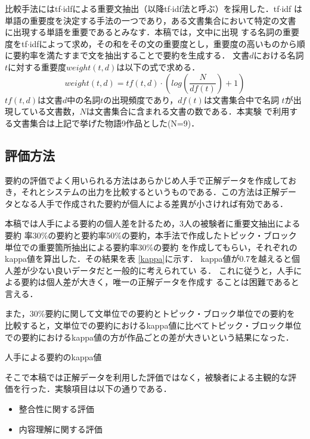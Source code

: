 \documentclass[japanese]{jnlp_1.4}
\begin{document}
 比較手法にはtf$\cdot$idfによる重要文抽出（以降tf$\cdot$idf法と呼ぶ）を採用した．tf$\cdot$idf
 は単語の重要度を決定する手法の一つであり，ある文書集合において特定の文書
 に出現する単語を重要であるとみなす．本稿では，文中に出現
 する名詞の重要度をtf$\cdot$idfによって求め，その和をその文の重要度とし，重要度の高いものから順に要約率を満たすまで文を抽出することで要約を生成する．
 文書$d$における名詞$t$に対する重要度$weight(t,d)$は以下の式で求める．
 \[
  weight(t,d)=tf(t,d) \cdot (log\left(\frac{N}{df(t)}\right)+1)
 \]
$tf(t,d)$は文書$d$中の名詞$t$の出現頻度であり，$df(t)$は文書集合中で名詞
$t$が出現している文書数，$N$は文書集合に含まれる文書の数である．本実験
で利用する文書集合は上記で挙げた物語9作品とした(N=9)．


 \subsection{評価方法}

 要約の評価でよく用いられる方法はあらかじめ人手で正解データを作成してお
 き，それとシステムの出力を比較するというものである．この方法は正解デー
 タとなる人手で作成された要約が個人による差異が小さければ有効である．

 本稿では人手による要約の個人差を計るため，3人の被験者に重要文抽出による要約
 率30\%の要約と要約率50\%の要約，本手法で作成したトピック・ブロック
 単位での重要箇所抽出による要約率30\%の要約
 を作成してもらい，それぞれのkappa値\cite{jean1996}を算出した．その結果を表
 \ref{kappa}に示す．
 kappa値が0.7を越えると個人差が少ない良いデータだと一般的に考えられてい
 る．
 これに従うと，人手による要約は個人差が大きく，唯一の正解データを作成す
 ることは困難であると言える．

 また，30\%要約に関して文単位での要約とトピック・ブロック単位での要約を
 比較すると，文単位での要約におけるkappa値に比べてトピック・ブロック単位
 での要約におけるkappa値の方が作品ごとの差が大きいという結果になった．

 \begin{table}[t]
   \caption{人手による要約のkappa値}\label{kappa}
  \begin{center}

  \end{center}
 \end{table}

 そこで本稿では正解データを利用した評価ではなく，被験者による主観的な評
 価を行った．実験項目は以下の通りである．
 \begin{itemize}
  \item 整合性に関する評価
  \item 内容理解に関する評価
 \end{itemize}
\end{document}
